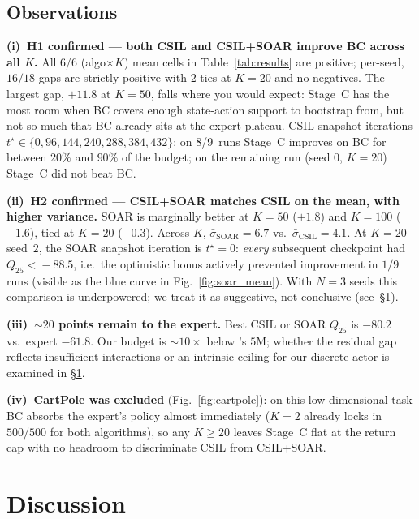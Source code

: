 \documentclass[10pt]{article}
\begin{document}
\subsection{Observations}

\textbf{(i)~H1 confirmed --- both CSIL and CSIL+SOAR improve BC
across all $K$.} All 6/6 (algo$\times$$K$) mean cells in
Table~\ref{tab:results} are positive; per-seed, $16/18$ gaps are
strictly positive with $2$ ties at $K\!=\!20$ and no negatives. The largest gap, $+11.8$ at
$K\!=\!50$, falls where you would expect: Stage~C has the most room
when BC covers enough state-action support to bootstrap from, but
not so much that BC already sits at the expert plateau. CSIL snapshot iterations
$t^\star\!\in\!\{0,96,144,240,288,384,432\}$: on 8/9~runs Stage~C
improves on BC for between $20\%$ and $90\%$ of the budget; on the
remaining run (seed $0$, $K\!=\!20$) Stage~C did not beat BC.

\textbf{(ii)~H2 confirmed --- CSIL+SOAR matches CSIL on the mean,
with higher variance.} SOAR is marginally better at $K\!=\!50$
($+1.8$) and $K\!=\!100$ ($+1.6$), tied at $K\!=\!20$ ($-0.3$). Across
$K$, $\bar\sigma_{\mathrm{SOAR}}\!=\!6.7$ vs.\
$\bar\sigma_{\mathrm{CSIL}}\!=\!4.1$. At $K\!=\!20$ seed~$2$, the SOAR
snapshot iteration is $t^\star\!=\!0$: \emph{every} subsequent
checkpoint had $Q_{25}\!<\!-88.5$, i.e.\ the optimistic bonus actively
prevented improvement in $1/9$ runs (visible as the blue curve in
Fig.~\ref{fig:soar_mean}). With $N\!=\!3$ seeds this comparison is
underpowered; we treat it as suggestive, not conclusive
(see~\S\ref{sec:discussion}).

\textbf{(iii)~$\sim\!20$ points remain to the expert.} Best CSIL or
SOAR $Q_{25}$ is $-80.2$ vs.\ expert $-61.8$. Our budget is
$\sim\!10\!\times$ below \cite{watson2023csil}'s $5$M; whether the
residual gap reflects insufficient interactions or an intrinsic
ceiling for our discrete actor is examined in \S\ref{sec:discussion}.

\textbf{(iv)~CartPole was excluded} (Fig.~\ref{fig:cartpole}): on this
low-dimensional task BC absorbs the expert's policy almost immediately
($K\!=\!2$ already locks in $500/500$ for both algorithms), so any
$K\!\ge\!20$ leaves Stage~C flat at the return cap with no headroom
to discriminate CSIL from CSIL+SOAR.

\section{Discussion}\label{sec:discussion}
\end{document}
